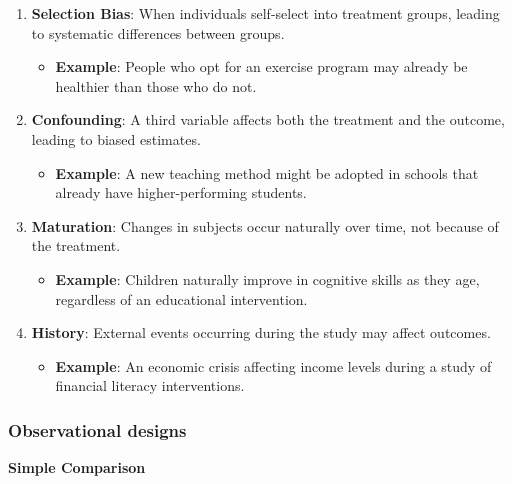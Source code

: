 \documentclass[
  letterpaper,
  DIV=11,
  numbers=noendperiod]{scrartcl}
\providecommand{\tightlist}{%
  \setlength{\itemsep}{0pt}\setlength{\parskip}{0pt}}\usepackage{longtable,booktabs,array}
\begin{document}
\begin{enumerate}
\def\labelenumi{\arabic{enumi}.}
\tightlist
\item
  \textbf{Selection Bias}: When individuals self-select into treatment
  groups, leading to systematic differences between groups.

  \begin{itemize}
  \tightlist
  \item
    \textbf{Example}: People who opt for an exercise program may already
    be healthier than those who do not.
  \end{itemize}
\item
  \textbf{Confounding}: A third variable affects both the treatment and
  the outcome, leading to biased estimates.

  \begin{itemize}
  \tightlist
  \item
    \textbf{Example}: A new teaching method might be adopted in schools
    that already have higher-performing students.
  \end{itemize}
\item
  \textbf{Maturation}: Changes in subjects occur naturally over time,
  not because of the treatment.

  \begin{itemize}
  \tightlist
  \item
    \textbf{Example}: Children naturally improve in cognitive skills as
    they age, regardless of an educational intervention.
  \end{itemize}
\item
  \textbf{History}: External events occurring during the study may
  affect outcomes.

  \begin{itemize}
  \tightlist
  \item
    \textbf{Example}: An economic crisis affecting income levels during
    a study of financial literacy interventions.
  \end{itemize}
\end{enumerate}

\subsubsection{Observational designs}\label{observational-designs}

\textbf{Simple Comparison}
\end{document}
